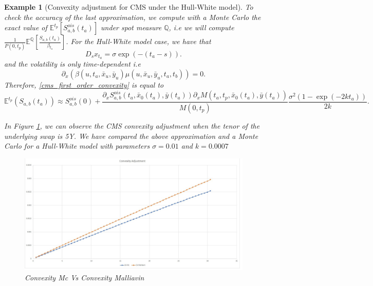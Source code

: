 \documentclass[a4paper,10pt]{article}
\newtheorem{example}[theorem]{Example}
\newcommand{\1}{\mathbf{1}}
\begin{document}
\begin{example}[Convexity adjustment for CMS under the Hull-White model]
To check the accuracy of the last approximation, we compute with a Monte Carlo the exact value of $\mathbb{E}^{t_p}\left[S^{ois}_{a,b}(t_a)\right]$ under spot measure $\mathbb{Q}$, i.e we will compute  $\frac{1}{P(0,t_p)}  \mathbb{E}^{\mathbb{Q}}\left[\frac{S_{a,b}(t_a)}{\beta_{t_a}} \right]$. For the Hull-White model case, we have that
\begin{equation*}
D_s x_{t_a} = \sigma \exp(-(t_a - s)).
\end{equation*}
and the volatility is only time-dependent i.e 
$$
\partial_x (\beta(u,t_a,\bar{x}_u,\bar{y}_u) \mu(u,\bar{x}_u, \bar{y}_u,t_a,t_b)) = 0.
$$
Therefore, \eqref{cms_first_order_convexity} is equal to
\begin{equation*}
\mathbb{E}^{t_p}\left(S_{a,b}(t_a)\right) \approx  S^{ois}_{a,b}(0) + \frac{\partial_x S^{ois}_{a,b}(t_a, \bar{x}_0(t_a),\bar{y}(t_a))\partial_x M(t_a,t_p, \bar{x}_0(t_a),\bar{y}(t_a))}{M(0,t_p)} \frac{\sigma^{2}(1-\exp(-2kt_a))}{2k}.
\end{equation*}

In Figure \ref{fig:CMS}, we can observe the CMS convexity adjustment when the tenor of the underlying swap is 5Y. We have compared the above approximation and a Monte Carlo for a Hull-White model with parameters $\sigma=0.01$ and $k=0.0007$

\begin{figure}[H]
	\begin{center}
		\includegraphics[scale=0.25]{Figures/cms_convexity_order.jpg}
	\end{center}
	\caption{Convexity Mc Vs Convexity Malliavin}
	\label{fig:CMS}
\end{figure} 
\end{example}
\end{document}
